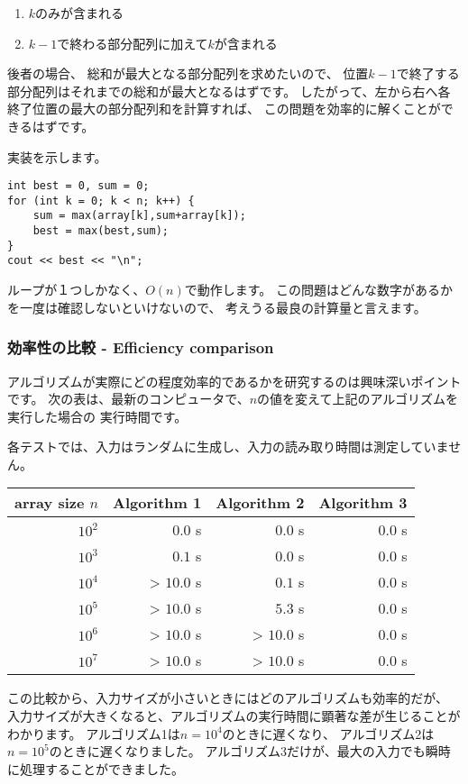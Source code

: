 \begin{enumerate}
\item $k$のみが含まれる
\item $k-1$で終わる部分配列に加えて$k$が含まれる
\end{enumerate}

後者の場合、
総和が最大となる部分配列を求めたいので、
位置$k - 1$で終了する部分配列はそれまでの総和が最大となるはずです。
したがって、左から右へ各終了位置の最大の部分配列和を計算すれば、
この問題を効率的に解くことができるはずです。

実装を示します。
\begin{lstlisting}
int best = 0, sum = 0;
for (int k = 0; k < n; k++) {
    sum = max(array[k],sum+array[k]);
    best = max(best,sum);
}
cout << best << "\n";
\end{lstlisting}

ループが１つしかなく、$O(n)$で動作します。
この問題はどんな数字があるかを一度は確認しないといけないので、
考えうる最良の計算量と言えます。

\subsubsection{効率性の比較 - Efficiency comparison}

アルゴリズムが実際にどの程度効率的であるかを研究するのは興味深いポイントです。
次の表は、最新のコンピュータで、$n$の値を変えて上記のアルゴリズムを実行した場合の
実行時間です。

各テストでは、入力はランダムに生成し、入力の読み取り時間は測定していません。

\begin{center}
\begin{tabular}{rrrr}
array size $n$ & Algorithm 1 & Algorithm 2 & Algorithm 3 \\
\hline
$10^2$ & $0.0$ s & $0.0$ s & $0.0$ s \\
$10^3$ & $0.1$ s & $0.0$ s & $0.0$ s \\
$10^4$ & > $10.0$ s & $0.1$ s & $0.0$ s \\
$10^5$ & > $10.0$ s & $5.3$ s & $0.0$ s \\
$10^6$ & > $10.0$ s & > $10.0$ s & $0.0$ s \\
$10^7$ & > $10.0$ s & > $10.0$ s & $0.0$ s \\
\end{tabular}
\end{center}

この比較から、入力サイズが小さいときにはどのアルゴリズムも効率的だが、
入力サイズが大きくなると、アルゴリズムの実行時間に顕著な差が生じることがわかります。
アルゴリズム1は$n=10^4$のときに遅くなり、
アルゴリズム2は$n=10^5$のときに遅くなりました。
アルゴリズム3だけが、最大の入力でも瞬時に処理することができました。
